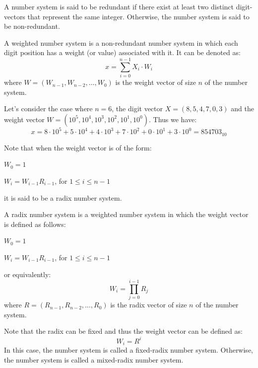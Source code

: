 \begin{definition}
    A number system is said to be redundant if there exist at least two distinct digit-vectors that represent the same integer. Otherwise, the number system is said to be non-redundant.
\end{definition}

\begin{definition}
    A weighted number system is a non-redundant number system in which each digit position has a weight (or value) associated with it. It can be denoted as:
    \[
        x = \sum_{i = 0}^{n - 1} X_i \cdot W_i
    \]
    where $W = (W_{n-1}, W_{n-2}, \ldots, W_0)$ is the weight vector of size $n$ of the number system.
\end{definition}

\begin{eg}
    Let's consider the case where $n = 6$, the digit vector $X = (8,5,4,7,0,3)$ and the weight vector $W = (10^5, 10^4, 10^3, 10^2, 10^1, 10^0)$. Thus we have:
    \[
        x = 8 \cdot 10^5 + 5 \cdot 10^4 + 4 \cdot 10^3 + 7 \cdot 10^2 + 0 \cdot 10^1 + 3 \cdot 10^0 = 854703_{10}
    \]
\end{eg}
Note that when the weight vector is of the form:
\begin{citemize}
    \item $W_0 = 1$
    \item $W_i = W_{i-1} R_{i-1}$, for $1 \leq i \leq n - 1$
\end{citemize}
it is said to be a radix number system.

\begin{definition}
    A radix number system is a weighted number system in which the weight vector is defined as follows:
    \begin{citemize}
        \item $W_0 = 1$
        \item $W_i = W_{i-1} R_{i-1}$, for $1 \leq i \leq n - 1$
    \end{citemize}
    or equivalently:
    \[
        W_i = \prod_{j = 0}^{i - 1} R_j
    \]
    where $R = (R_{n-1}, R_{n-2}, \ldots, R_0)$ is the radix vector of size $n$ of the number system.
\end{definition}
Note that the radix can be fixed and thus the weight vector can be defined as:
\[
    W_i = R^i
\]
In this case, the number system is called a fixed-radix number system. Otherwise, the number system is called a mixed-radix number system.

